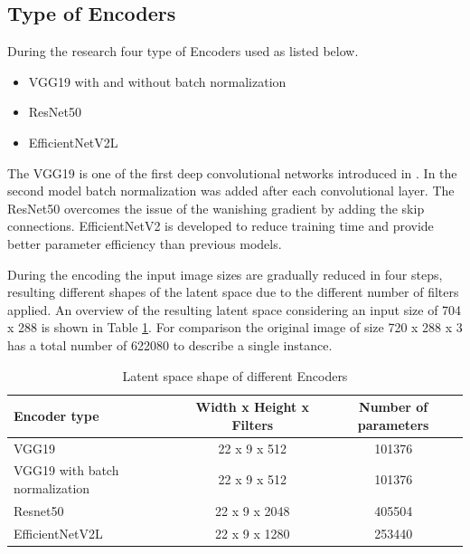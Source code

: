 \subsection{Type of Encoders}
During the research four type of Encoders used as listed below.

\begin{itemize}
    \item VGG19 with and without batch normalization
    \item ResNet50
    \item EfficientNetV2L
\end{itemize}

The VGG19 is one of the first deep convolutional networks introduced in \cite{simonyan_very_2015}.
In the second model batch normalization was added after each convolutional layer.
The ResNet50 \cite{he_deep_2015} overcomes the issue of the wanishing gradient
by adding the skip connections.
EfficientNetV2 \cite{tan_efficientnetv2_2021} is developed to reduce training time
and provide better parameter efficiency than previous models.

During the encoding the input image sizes are gradually reduced in four steps,
resulting different shapes of the latent space due to the different number of filters applied.
An overview of the resulting latent space considering an input size of 704 x 288
is shown in Table \ref{table:latent_space_shape}.
For comparison the original image of size 720 x 288 x 3 has a total number of 622080 to describe
a single instance.

\begin{table}[!ht]
    \centering
    \begin{tabular}{l c c}
        Encoder type                   & Width x Height x Filters & Number of parameters \\
        \hline
        VGG19                          & 22 x 9 x 512             & 101376               \\
        VGG19 with batch normalization & 22 x 9 x 512             & 101376               \\
        Resnet50                       & 22 x 9 x 2048            & 405504               \\
        EfficientNetV2L                & 22 x 9 x 1280            & 253440               \\
    \end{tabular}
    \caption{Latent space shape of different Encoders}
    \label{table:latent_space_shape}
\end{table}


